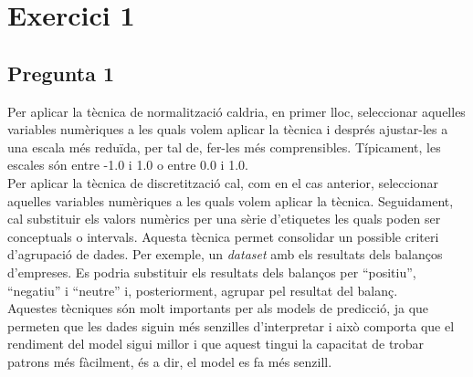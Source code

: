 \documentclass[a4paper,12pt]{report}
\begin{document}
\thispagestyle{empty}
	\begin{titlepage}
		\maketitle
		\thispagestyle{empty}
	\end{titlepage}
	\cleardoublepage
	\newpage

\thispagestyle{empty}
\tableofcontents
\thispagestyle{empty}
\listoffigures
\thispagestyle{empty}
\newpage
{}
\section*{Exercici 1}
\subsection*{Pregunta 1}
Per aplicar la tècnica de normalització caldria, en primer lloc, seleccionar aquelles variables numèriques a les quals volem aplicar la tècnica i després ajustar-les a una escala més reduïda, per tal de, fer-les més comprensibles. Típicament, les escales són entre -1.0 i 1.0 o entre 0.0 i 1.0.\\
Per aplicar la tècnica de discretització cal, com en el cas anterior, seleccionar aquelles variables numèriques a les quals volem aplicar la tècnica. Seguidament, cal substituir els valors numèrics per una sèrie d'etiquetes les quals poden ser conceptuals o intervals. Aquesta tècnica permet consolidar un possible criteri d'agrupació de dades. Per exemple, un \textit{dataset} amb els resultats dels balanços d'empreses. Es podria substituir els resultats dels balanços per ``positiu'', ``negatiu'' i ``neutre'' i, posteriorment, agrupar pel resultat del balanç.\\
Aquestes tècniques són molt importants per als models de predicció, ja que permeten que les dades siguin més senzilles d'interpretar i això comporta que el rendiment del model sigui millor i que aquest tingui la capacitat de trobar patrons més fàcilment, és a dir, el model es fa més senzill.
\end{document}
